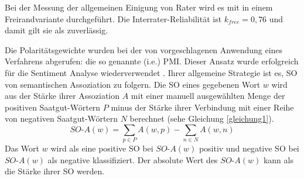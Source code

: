 Bei der Messung der allgemeinen Einigung von Rater wird es mit \citet{cohen1960coefficient} in einem Freirandvariante \citet{brennan1981coefficient} durchgeführt. Die Interrater-Reliabilität ist $k_{free} = 0,76$ und damit gilt sie als zuverlässig. \citep{Remus2010}

Die Polaritätsgewichte wurden bei der von \citet{church1990word} vorgeschlagenen Anwendung eines Verfahrens abgerufen: die so genannte (\ac{i.e.}) \ac{PMI}. Dieser Ansatz wurde erfolgreich für die Sentiment Analyse wiederverwendet \citep{turney2003measuring, turney2002thumbs}. Ihrer allgemeine Strategie ist es, \ac{SO} von semantischen Assoziation zu folgern. Die \ac{SO} eines gegebenen Wort $w$ wird aus der Stärke ihrer Assoziation $A$ mit einer manuell ausgewählten Menge der positiven Saatgut-Wörtern $P$ minus der Stärke ihrer Verbindung mit einer Reihe von negativen Saatgut-Wörtern $N$ berechnet (sehe Gleichung \ref{gleichung1}). \citep{Remus2010}
\begin{equation} 
\label{gleichung1}
SO\text{-}A(w) = \displaystyle\sum_{p \in P} A(w, p) - \displaystyle\sum_{n \in N} A(w, n)
\end{equation}
Das Wort $w$ wird als eine positive \ac{SO} bei $SO\text{-}A(w)$ positiv und negative \ac{SO} bei $SO\text{-}A(w)$ als negative klassifiziert. Der absolute Wert des $SO\text{-}A(w)$ kann als die Stärke ihrer \ac{SO} werden. \citep{Remus2010}

